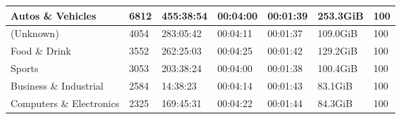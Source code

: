\begin{table}[]
\begin{tabular}{l|l|l|l|l|l|l}
Autos \& Vehicles                                  & 6812                                                & 455:38:54                                                & 00:04:00                                                & 00:01:39                                               & 253.3GiB                                             & 100                                                           \\ \hline
(Unknown)                                          & 4054                                                & 283:05:42                                                & 00:04:11                                                & 00:01:37                                               & 109.0GiB                                             & 100                                                           \\ \hline
Food \& Drink                                      & 3552                                                & 262:25:03                                                & 00:04:25                                                & 00:01:42                                               & 129.2GiB                                             & 100                                                           \\ \hline
Sports                                             & 3053                                                & 203:38:24                                                & 00:04:00                                                & 00:01:38                                               & 100.4GiB                                             & 100                                                           \\ \hline
Business \& Industrial                             & 2584                                                & 14:38:23                                                 & 00:04:14                                                & 00:01:43                                               & 83.1GiB                                              & 100                                                           \\ \hline
Computers \& Electronics                           & 2325                                                & 169:45:31                                                & 00:04:22                                                & 00:01:44                                               & 84.3GiB                                              & 100                                                           \\ \hline

\end{tabular}
\end{table}
